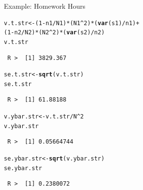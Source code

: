 \documentclass[10pt]{beamer}\usepackage[]{graphicx}\usepackage[]{xcolor}
\makeatletter
\newcommand{\hlnum}[1]{\textcolor[rgb]{0.686,0.059,0.569}{#1}}%
\newcommand{\hlopt}[1]{\textcolor[rgb]{0,0,0}{#1}}%
\newcommand{\hlstd}[1]{\textcolor[rgb]{0.345,0.345,0.345}{#1}}%
\newcommand{\hlkwb}[1]{\textcolor[rgb]{0.69,0.353,0.396}{#1}}%
\newcommand{\hlkwd}[1]{\textcolor[rgb]{0.737,0.353,0.396}{\textbf{#1}}}%
\newenvironment{kframe}{%
 \def\at@end@of@kframe{}%
 \ifinner\ifhmode%
  \def\at@end@of@kframe{\end{minipage}}%
  \begin{minipage}{\columnwidth}%
 \fi\fi%
 \def\FrameCommand##1{\hskip\@totalleftmargin \hskip-\fboxsep
 \colorbox{shadecolor}{##1}\hskip-\fboxsep
     \hskip-\linewidth \hskip-\@totalleftmargin \hskip\columnwidth}%
 \MakeFramed {\advance\hsize-\width
   \@totalleftmargin\z@ \linewidth\hsize
   \@setminipage}}%
 {\par\unskip\endMakeFramed%
 \at@end@of@kframe}
\newenvironment{knitrout}{}{} %
\makeatother
\begin{document}
\begin{frame}[containsverbatim]{Example: Homework Hours}
\small
\begin{knitrout}
\color{fgcolor}\begin{kframe}
\begin{alltt}
\hlstd{v.t.str} \hlkwb{<-} \hlstd{(}\hlnum{1} \hlopt{-} \hlstd{n1}\hlopt{/}\hlstd{N1)} \hlopt{*} \hlstd{(N1}\hlopt{^}\hlnum{2}\hlstd{)} \hlopt{*} \hlstd{(}\hlkwd{var}\hlstd{(s1)}\hlopt{/}\hlstd{n1)} \hlopt{+}
    \hlstd{(}\hlnum{1} \hlopt{-} \hlstd{n2}\hlopt{/}\hlstd{N2)} \hlopt{*} \hlstd{(N2}\hlopt{^}\hlnum{2}\hlstd{)} \hlopt{*} \hlstd{(}\hlkwd{var}\hlstd{(s2)}\hlopt{/}\hlstd{n2)}
\hlstd{v.t.str}
\end{alltt}
\begin{verbatim}
 R >  [1] 3829.367
\end{verbatim}
\begin{alltt}
\hlstd{se.t.str} \hlkwb{<-} \hlkwd{sqrt}\hlstd{(v.t.str)}
\hlstd{se.t.str}
\end{alltt}
\begin{verbatim}
 R >  [1] 61.88188
\end{verbatim}
\begin{alltt}
\hlstd{v.ybar.str} \hlkwb{<-} \hlstd{v.t.str}\hlopt{/}\hlstd{N}\hlopt{^}\hlnum{2}
\hlstd{v.ybar.str}
\end{alltt}
\begin{verbatim}
 R >  [1] 0.05664744
\end{verbatim}
\begin{alltt}
\hlstd{se.ybar.str} \hlkwb{<-} \hlkwd{sqrt}\hlstd{(v.ybar.str)}
\hlstd{se.ybar.str}
\end{alltt}
\begin{verbatim}
 R >  [1] 0.2380072
\end{verbatim}
\end{kframe}
\end{knitrout}
\end{frame}
\end{document}
